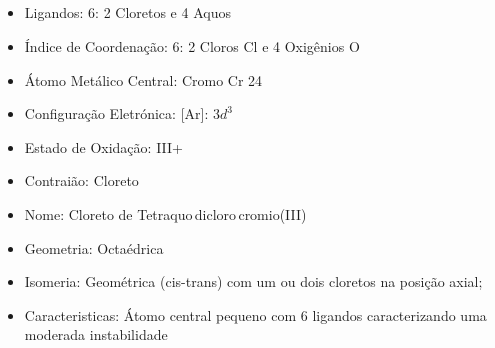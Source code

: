 \documentclass[12pt]{article}
\begin{document}
	\subsection{}
	\begin{itemize}
   
   
   \item Ligandos: 6:
   	2 Cloretos  e
		4 Aquos 
   
   
   \item Índice de Coordenação: 6:
   	2 Cloros Cl e
		4 Oxigênios O
   
   \item Átomo Metálico Central: Cromo Cr 24
   
   \item Configuração Eletrónica: [Ar]: $ 3d^3 $
   
   \item Estado de Oxidação: III+
   
   \item Contraião: Cloreto 
   
   \item Nome: Cloreto de Tetraquo\,dicloro\,cromio(III)
   
   \item Geometria: Octaédrica
   
   \item Isomeria:
   	Geométrica (cis-trans) com um ou dois cloretos na posição axial;

	\item Caracteristicas:
		Átomo central pequeno com 6 ligandos caracterizando uma moderada instabilidade

	\end{itemize}
	
\break

	
\end{document}
